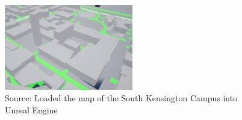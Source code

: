 \begin{figure}[H] 
    \centering
    \includegraphics[width=0.5\textwidth]{04_Implementation/Map.png} 
    \caption{Source: Loaded the map of the South Kensington Campus into Unreal Engine}
    \label{StreetMapIMG}
\end{figure}
